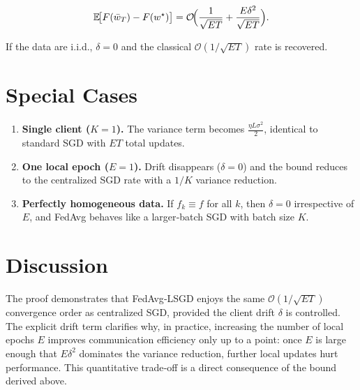 \documentclass{article}
\newcommand{\E}{\mathbb{E}}
\begin{document}
\[
\E\!\bigl[F(\bar w_T)-F(w^\star)\bigr]
= \mathcal O\!\Bigl(\frac{1}{\sqrt{ET}}+\frac{E\delta^2}{\sqrt{ET}}\Bigr).
\]

If the data are i.i.d., $\delta=0$ and the classical $\mathcal O(1/\sqrt{ET})$ rate is recovered.

\section*{Special Cases}
\begin{enumerate}[label={\alph*.}]
\item \textbf{Single client ($K=1$).}  
The variance term becomes $\frac{\eta L\sigma^2}{2}$, identical to standard SGD with $ET$ total updates.

\item \textbf{One local epoch ($E=1$).}  
Drift disappears ($\delta=0$) and the bound reduces to the centralized SGD rate with a $1/K$ variance reduction.

\item \textbf{Perfectly homogeneous data.}  
If $f_k\equiv f$ for all $k$, then $\delta=0$ irrespective of $E$, and FedAvg behaves like a larger‑batch SGD with batch size $K$.

\end{enumerate}

\section*{Discussion}
The proof demonstrates that FedAvg‑LSGD enjoys the same $\mathcal O(1/\sqrt{ET})$ convergence order as centralized SGD, provided the client drift $\delta$ is controlled.  The explicit drift term clarifies why, in practice, increasing the number of local epochs $E$ improves communication efficiency only up to a point: once $E$ is large enough that $E\delta^2$ dominates the variance reduction, further local updates hurt performance.  This quantitative trade‑off is a direct consequence of the bound derived above.
\end{document}
